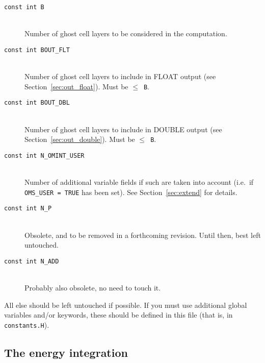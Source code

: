 \begin{description}
  
\item[{\tt const int B}]{\ }\\
  Number of ghost cell layers to be considered in the computation.
  
\item[{\tt const int BOUT\_FLT}]{\ }\\
  Number of ghost cell layers to include in FLOAT output (see
  Section~\ref{sec:out_float}). Must be \mbox{$\le$ {\tt B}}.
  
\item[{\tt const int BOUT\_DBL}]{\ }\\
  Number of ghost cell layers to include in DOUBLE output (see
  Section~\ref{sec:out_double}). Must be \mbox{$\le$ {\tt B}}.
  
\item[{\tt const int N\_OMINT\_USER}]{\ }\\
  Number of additional variable fields if such are taken into account
  (i.e.\ if \mbox{\tt OMS\_USER = TRUE} has been set). See
  Section~\ref{sec:extend} for details. 
  
\item[{\tt const int N\_P}]{\ }\\
  Obsolete, and to be removed in a forthcoming revision. Until then,
  best left untouched.
  
\item[{\tt const int N\_ADD}]{\ }\\
  Probably also obsolete, no need to touch it.
  
\end{description}
All else should be left untouched if possible. If you must use additional
global variables and/or keywords, these should be defined in this file
(that is, in {\tt constants.H}).

\subsection{The energy integration}
\label{sect:NRG}

